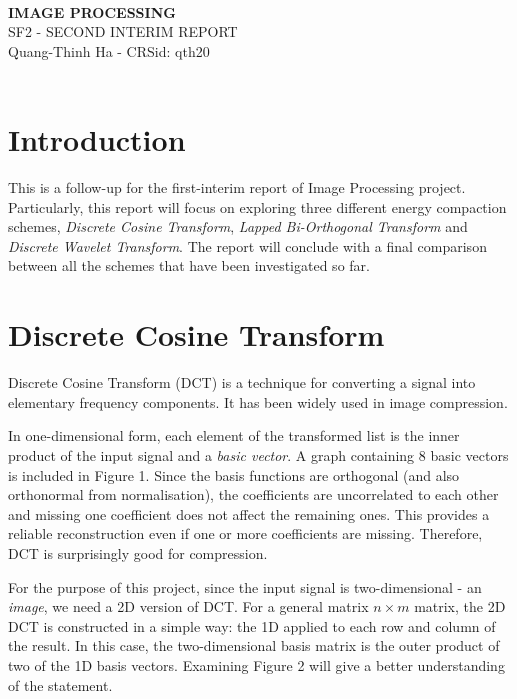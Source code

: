 \documentclass[a4paper, 11pt]{article}
\begin{document}
\Large
\begin{center}
\hrulefill \\
\textbf{IMAGE PROCESSING} \\
SF2 - SECOND INTERIM REPORT \\
\vspace{0.2cm}
\normalsize 
Quang-Thinh Ha - CRSid: qth20 \\
\hrulefill \\
\end{center}

\normalsize

\section{Introduction}
This is a follow-up for the first-interim report of Image Processing project. Particularly, this report will focus on exploring three different energy compaction schemes, \textit{Discrete Cosine Transform}, \textit{Lapped Bi-Orthogonal Transform} and \textit{Discrete Wavelet Transform}. The report will conclude with a final comparison between all the schemes that have been investigated so far. 

\section{Discrete Cosine Transform}
Discrete Cosine Transform (DCT) is a technique for converting a signal into elementary frequency components. It has been widely used in image compression. 

In one-dimensional form, each element of the transformed list is the inner product of the input signal and a \textit{basic vector}. A graph containing 8 basic vectors is included in Figure 1. Since the basis functions are orthogonal (and also orthonormal from normalisation), the coefficients are uncorrelated to each other and missing one coefficient does not affect the remaining ones. This provides a reliable reconstruction even if one or more coefficients are missing. Therefore, DCT is surprisingly good for compression. 

For the purpose of this project, since the input signal is two-dimensional - an \textit{image}, we need a 2D version of DCT. For a general matrix $n \times m$ matrix, the 2D DCT is constructed in a simple way: the 1D applied to each row and column of the result. In this case, the two-dimensional basis matrix is the outer product of two of the 1D basis vectors. Examining Figure 2 will give a better understanding of the statement. 
\end{document}
